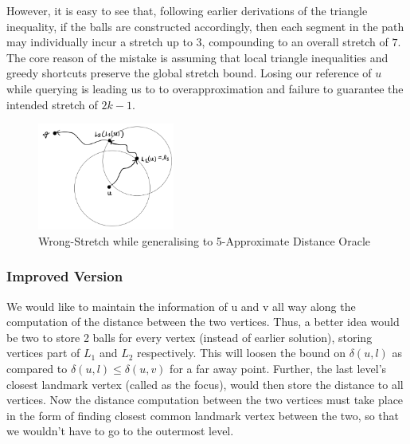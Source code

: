 \documentclass{article}
\begin{document}
However, it is easy to see that, following earlier derivations of the triangle inequality, if the balls are constructed accordingly, then each segment in the path may individually incur a stretch up to $3$, compounding to an overall stretch of $7$. The core reason of the mistake is assuming that local triangle inequalities and greedy shortcuts preserve the global stretch bound. Losing our reference of \(u\) while querying is leading us to to overapproximation and failure to guarantee the intended stretch of $2k - 1$.

\begin{figure}
    \begin{center}
        \includegraphics[width=0.4\textwidth]{img/wrongstretch.png}
        \caption{Wrong-Stretch while generalising to 5-Approximate Distance Oracle}
        \label{fig:wrongstretch}
    \end{center}
\end{figure}

\subsubsection{Improved Version}

We would like to maintain the information of u and v all way along the computation of the distance between the two vertices. Thus, a better idea would be two to store 2 balls for every vertex (instead of earlier solution), storing vertices part of $L_1$ and $L_2$ respectively. This will loosen the bound on \(\delta(u, l)\) as compared to \(\delta(u, l) \leq \delta(u, v)\) for a far away point. Further, the last level's closest landmark vertex (called as the focus), would then store the distance to all vertices. Now the distance computation between the two vertices must take place in the form of finding closest common landmark vertex between the two, so that we wouldn't have to go to the outermost level.
\end{document}
